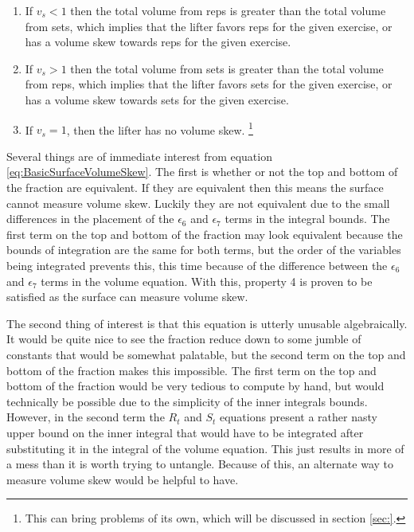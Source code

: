 \begin{enumerate}
    \item If $v_s<1$ then the total volume from reps is greater than the total volume from sets, which implies that the lifter favors reps for the given exercise, or has a volume skew towards reps for the given exercise.
    \item If $v_s>1$ then the total volume from sets is greater than the total volume from reps, which implies that the lifter favors sets for the given exercise, or has a volume skew towards sets for the given exercise.
    \item If $v_s=1$, then the lifter has no volume skew. \footnote{This can bring problems of its own, which will be discussed in section \ref{sec:}.}
\end{enumerate}

Several things are of immediate interest from equation \ref{eq:BasicSurfaceVolumeSkew}. The first is whether or not the top and bottom of the fraction are equivalent. If they are equivalent then this means the surface cannot measure volume skew. Luckily they are not equivalent due to the small differences in the placement of the $\epsilon_6$ and $\epsilon_7$ terms in the integral bounds. The first term on the top and bottom of the fraction may look equivalent because the bounds of integration are the same for both terms, but the order of the variables being integrated prevents this, this time because of the difference between the $\epsilon_6$ and $\epsilon_7$ terms in the volume equation. With this, property 4 is proven to be satisfied as the surface can measure volume skew.

The second thing of interest is that this equation is utterly unusable algebraically. It would be quite nice to see the fraction reduce down to some jumble of constants that would be somewhat palatable, but the second term on the top and bottom of the fraction makes this impossible. The first term on the top and bottom of the fraction would be very tedious to compute by hand, but would technically be possible due to the simplicity of the inner integrals bounds. However, in the second term the $R_t$ and $S_t$ equations present a rather nasty upper bound on the inner integral that would have to be integrated after substituting it in the integral of the volume equation. This just results in more of a mess than it is worth trying to untangle. Because of this, an alternate way to measure volume skew would be helpful to have.

